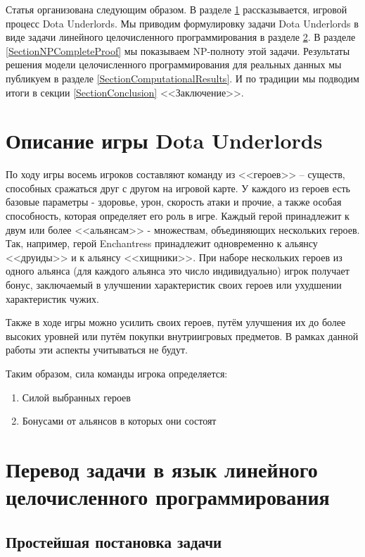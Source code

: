 \documentclass{article}
\begin{document}
Статья организована следующим образом. В разделе \ref{SectionDUDescription} рассказывается, игровой процесс Dota Underlords. Мы приводим формулировку задачи Dota Underlords в виде задачи линейного целочисленного программирования в разделе \ref{SectionDUIP}. В разделе \ref{SectionNPCompleteProof} мы показываем NP-полноту этой задачи. Результаты решения модели целочисленного программирования для реальных данных мы публикуем в разделе \ref{SectionComputationalResults}. И по традиции мы подводим итоги в секции \ref{SectionConclusion} <<Заключение>>.

\section{Описание игры Dota Underlords}
\label{SectionDUDescription}

По ходу игры восемь игроков составляют команду из <<героев>> – существ, способных сражаться друг с другом на игровой карте. У каждого из героев есть базовые параметры - здоровье, урон, скорость атаки и прочие, а также особая способность, которая определяет его роль в игре. Каждый герой принадлежит к двум или более <<альянсам>> - множествам, объединяющих нескольких героев. Так, например, герой Enchantress принадлежит одновременно к альянсу <<друиды>> и к альянсу <<хищники>>. При наборе нескольких героев из одного альянса (для каждого альянса это число индивидуально) игрок получает бонус, заключаемый в улучшении характеристик своих героев или ухудшении характеристик чужих.

Также в ходе игры можно усилить своих героев, путём улучшения их до более высоких уровней или путём покупки внутриигровых предметов. В рамках данной работы эти аспекты учитываться не будут.

Таким образом, сила команды игрока определяется:

\begin{enumerate}
    \item Силой выбранных героев
    \item Бонусами от альянсов в которых они состоят
\end{enumerate}


\section{Перевод задачи в язык линейного целочисленного программирования }
\label{SectionDUIP}

\subsection{Простейшая постановка задачи}
\end{document}
